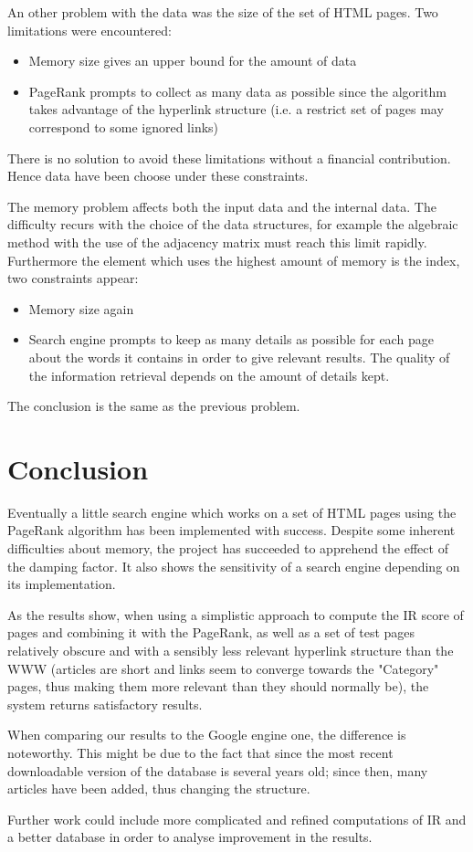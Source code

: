 \documentclass[pdftex,12pt,a4paper]{article}
\begin{document}
An other problem with the data was the size of the set of HTML pages. Two limitations were encountered:
\begin{itemize}
\item Memory size gives an upper bound for the amount of data
\item PageRank prompts to collect as many data as possible since the algorithm takes advantage of the hyperlink structure (i.e. a restrict set of pages may correspond to some ignored links)
\end{itemize}
There is no solution to avoid these limitations without a financial contribution. Hence data have been choose under these constraints.

The memory problem affects both the input data and the internal data. The difficulty recurs with the choice of the data structures, for example the algebraic method with the use of the adjacency matrix must reach this limit rapidly. Furthermore the element which uses the highest amount of memory is the index, two constraints appear:
\begin{itemize}
\item Memory size again
\item Search engine prompts to keep as many details as possible for each page about the words it contains in order to give relevant results. The quality of the information retrieval depends on the amount of details kept.
\end{itemize}
The conclusion is the same as the previous problem.


\section{Conclusion}

Eventually a little search engine which works on a set of HTML pages using the PageRank algorithm has been implemented with success. Despite some inherent difficulties about memory, the project has succeeded to apprehend the effect of the damping factor. It also shows  the sensitivity of a search engine depending on its implementation.

As the results show,  when using a simplistic approach to compute the IR score of pages and combining it with the PageRank, as well as a set of test pages relatively obscure and with a sensibly less relevant hyperlink structure than the WWW (articles are short and links seem to converge towards the "Category" pages, thus making them more relevant than they should normally be), the system returns satisfactory results. 

When comparing our results to the Google engine one, the difference is noteworthy. This might be due to the fact that since the most recent downloadable version of the database is several years old; since then, many articles have been added, thus changing the structure.

Further work could include more complicated and refined computations of IR and a better database  in order to analyse improvement in the results.
\end{document}
